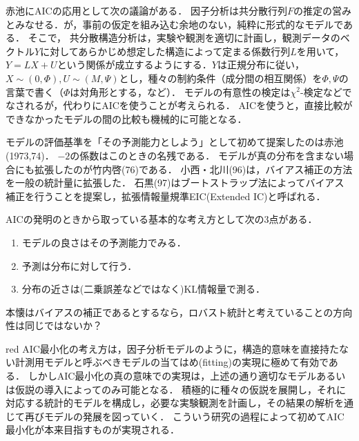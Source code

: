 \documentclass[uplatex,dvipdfmx]{jsreport}
\begin{document}
\begin{example}
    赤池\cite{赤池79}にAICの応用として次の議論がある．
    因子分析は共分散行列$F$の推定の営みとみなせる．が，事前の仮定を組み込む余地のない，純粋に形式的なモデルである．
    そこで，
    共分散構造分析は，実験や観測を適切に計画し，観測データのベクトル$Y$に対してあらかじめ想定した構造によって定まる係数行列$L$を用いて，
    $Y=LX+U$という関係が成立するようにする．$Y$は正規分布に従い，$X\sim(0,\Phi),U\sim(M,\Psi)$とし，種々の制約条件（成分間の相互関係）を$\Phi,\Psi$の言葉で書く（$\Phi$は対角形とする，など）．
    モデルの有意性の検定は$\chi^2$-検定などでなされるが，代わりにAICを使うことが考えられる．
    AICを使うと，直接比較ができなかったモデルの間の比較も機械的に可能となる．
\end{example}

\begin{history}
    モデルの評価基準を「その予測能力としよう」として初めて提案したのは赤池(1973,74)．
    $-2$の係数はこのときの名残である．
    モデルが真の分布を含まない場合にも拡張したのが竹内啓(76)である．
    小西・北川(96)は，バイアス補正の方法を一般の統計量に拡張した．
    石黒(97)はブートストラップ法によってバイアス補正を行うことを提案し，拡張情報量規準EIC(Extended IC)と呼ばれる．
\end{history}

\begin{remark}
    AICの発明のときから取っている基本的な考え方として次の3点がある．
    \begin{enumerate}
        \item モデルの良さはその予測能力でみる．
        \item 予測は分布に対して行う．
        \item 分布の近さは(二乗誤差などではなく)KL情報量で測る．
    \end{enumerate}
\end{remark}

\begin{remarks}
    本懐はバイアスの補正であるとするなら，ロバスト統計と考えていることの方向性は同じではないか？
\end{remarks}

\begin{tbox}{red}{\cite{赤池79}}
    AIC最小化の考え方は，因子分析モデルのように，構造的意味を直接持たない計測用モデルと呼ぶべきモデルの当てはめ(fitting)の実現に極めて有効である．
    しかしAIC最小化の真の意味での実現は，上述の通り適切なモデルあるいは仮説の導入によってのみ可能となる．
    積極的に種々の仮説を展開し，それに対応する統計的モデルを構成し，必要な実験観測を計画し，その結果の解析を通じて再びモデルの発展を図っていく．
    こういう研究の過程によって初めてAIC最小化が本来目指すものが実現される．
\end{tbox}
\end{document}

